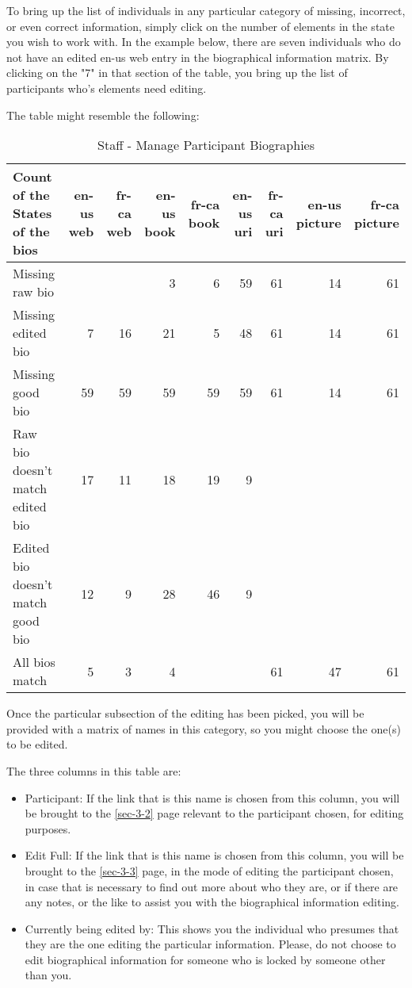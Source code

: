 \documentclass[captions=tablesignature]{scrartcl}
\begin{document}
To bring up the list of individuals in any particular category of
missing, incorrect, or even correct information, simply click on
the number of elements in the state you wish to work with.  In the
example below, there are seven individuals who do not have an
edited en-us web entry in the biographical information matrix.  By
clicking on the "7" in that section of the table, you bring up the
list of participants who's elements need editing.

The table might resemble the following:
\begin{table}[htb]
\caption{\label{tbl:staffmanageparticipantbiographies}Staff - Manage Participant Biographies}
\centering
\begin{tabular}{lrrrrrrrr}
\hline
Count of the States of the bios & en-us web & fr-ca web & en-us book & fr-ca book & en-us uri & fr-ca uri & en-us picture & fr-ca picture\\
\hline
Missing raw bio &  &  & 3 & 6 & 59 & 61 & 14 & 61\\
Missing edited bio & 7 & 16 & 21 & 5 & 48 & 61 & 14 & 61\\
Missing good bio & 59 & 59 & 59 & 59 & 59 & 61 & 14 & 61\\
Raw bio doesn't match edited bio & 17 & 11 & 18 & 19 & 9 &  &  & \\
Edited bio doesn't match good bio & 12 & 9 & 28 & 46 & 9 &  &  & \\
All bios match & 5 & 3 & 4 &  &  & 61 & 47 & 61\\
\hline
\end{tabular}
\end{table}

Once the particular subsection of the editing has been picked, you
will be provided with a matrix of names in this category, so you
might choose the one(s) to be edited.

The three columns in this table are:
\begin{itemize}
\item Participant: If the link that is this name is chosen from this
column, you will be brought to the \ref{sec-3-2} page
relevant to the participant chosen, for editing purposes.
\item Edit Full: If the link that is this name is chosen from this
column, you will be brought to the \ref{sec-3-3}
page, in the mode of editing the participant chosen, in case that
is necessary to find out more about who they are, or if there are
any notes, or the like to assist you with the biographical
information editing.
\item Currently being edited by: This shows you the individual who
presumes that they are the one editing the particular
information.  Please, do not choose to edit biographical
information for someone who is locked by someone other than you.
\end{itemize}
\end{document}
